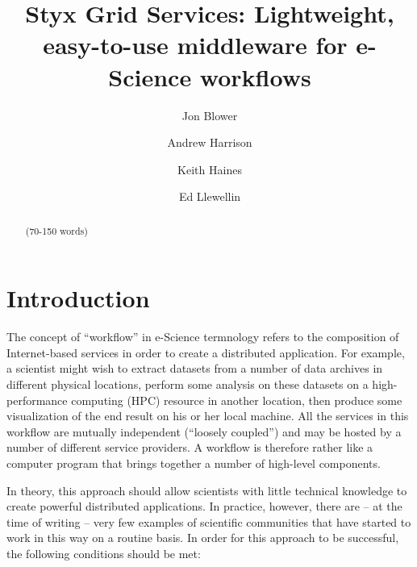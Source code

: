 \documentclass{llncs}
\begin{document}
%
\title{Styx Grid Services: Lightweight, easy-to-use middleware for e-Science workflows}
%
%
\author{Jon Blower \and Andrew Harrison
\and Keith Haines \and Ed Llewellin}
%
%
%

\maketitle              %

\begin{abstract}
(70-150 words)
\end{abstract}
%
\section{Introduction}
The concept of ``workflow'' in e-Science termnology refers to the composition of Internet-based services in order to create a distributed application.  For example, a scientist might wish to extract datasets from a number of data archives in different physical locations, perform some analysis on these datasets on a high-performance computing (HPC) resource in another location, then produce some visualization of the end result on his or her local machine.  All the services in this workflow are mutually independent (``loosely coupled'') and may be hosted by a number of different service providers.  A workflow is therefore rather like a computer program that brings together a number of high-level components.

In theory, this approach should allow scientists with little technical knowledge to create powerful distributed applications.  In practice, however, there are -- at the time of writing -- very few examples of scientific communities that have started to work in this way on a routine basis.  In order for this approach to be successful, the following conditions should be met:
\end{document}
